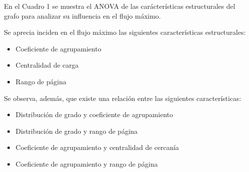 \documentclass{article}
\begin{document}
En el Cuadro 1 se muestra el ANOVA de las carácterísticas estructurales del grafo para analizar su influencia en el flujo máximo.

Se aprecia inciden en el flujo máximo las siguientes características estructurales:  

\begin{itemize}
\item Coeficiente de agrupamiento 
\item Centralidad de carga
\item Rango de página 
\end{itemize}

Se observa, además, que existe una relación entre las siguientes características:

\begin{itemize}
\item Distribución de grado y coeficiente de agrupamiento 
\item Distribución de grado y rango de página
\item Coeficiente de agrupamiento y centralidad de cercanía
\item Coeficiente de agrupamiento y rango de página

\end{itemize}
\end{document}
